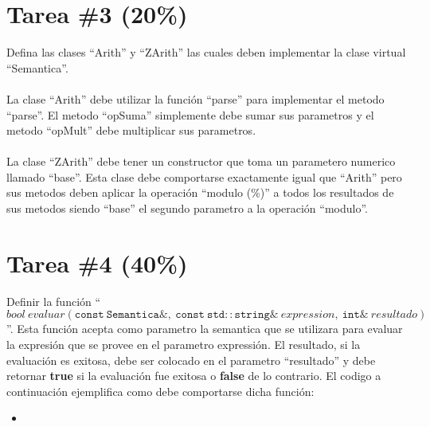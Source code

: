 \documentclass{article}
\newcommand{\perlscript}[2]{
\begin{itemize}
\item[]
\end{itemize}
}
\begin{document}
\section*{Tarea \#3 (20\%)}
Defina las clases ``Arith'' y ``ZArith'' las cuales deben implementar la clase virtual ``Semantica''.
\\\\
La clase ``Arith'' debe utilizar la funci\'on ``parse'' para implementar el metodo ``parse''. El metodo
``opSuma'' simplemente debe sumar sus parametros y el metodo ``opMult'' debe multiplicar sus parametros.
\\\\
La clase ``ZArith'' debe tener un constructor que toma un parametero numerico llamado ``base''. Esta clase
debe comportarse exactamente igual que ``Arith'' pero sus metodos deben aplicar la operaci\'on ``modulo (\%)''
a todos los resultados de sus metodos siendo ``base'' el segundo parametro a la operaci\'on ``modulo''. 

\section*{Tarea \#4 (40\%)}

Definir la funci\'on ``$bool\ evaluar(\mathtt{const\ Semantica\&},\ \mathtt{const\ std::string\&}\ expression,\ \mathtt{int\&}\ resultado)$''.
Esta funci\'on acepta como parametro la semantica que se utilizara para evaluar la expresi\'on que se provee
en el parametro expressi\'on. El resultado, si la evaluaci\'on es exitosa, debe ser colocado en el parametro
``resultado'' y debe retornar {\bf true} si la evaluaci\'on fue exitosa o {\bf false} de lo contrario. El codigo
a continuaci\'on ejemplifica como debe comportarse dicha funci\'on:
\perlscript{evaluar.cc}{Tarea \#4}
\end{document}
